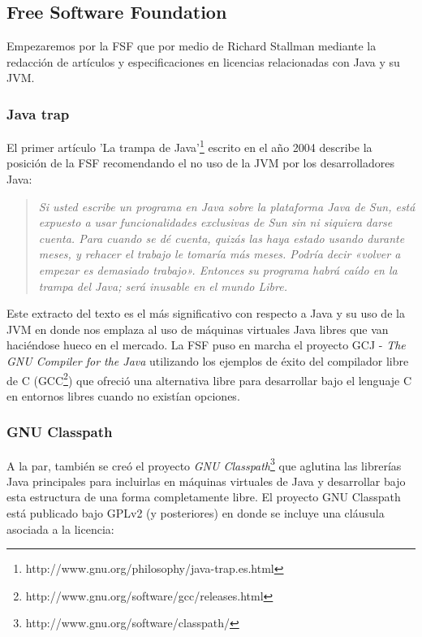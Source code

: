 \documentclass[11pt]{scrartcl}
\begin{document}
\subsection{Free Software Foundation}

Empezaremos por la FSF que por medio de Richard Stallman mediante la redacción de artículos y especificaciones en licencias relacionadas con Java y su JVM.

\subsubsection{Java trap}

El primer artículo 'La trampa de Java'\footnote{http://www.gnu.org/philosophy/java-trap.es.html} escrito en el año 2004 describe la posición de la FSF recomendando el no uso de la JVM por los desarrolladores Java:

\begin{quotation}
    \emph{Si usted escribe un programa en Java sobre la plataforma Java de Sun, está expuesto a usar funcionalidades exclusivas de Sun sin ni siquiera darse cuenta. Para cuando se dé cuenta, quizás las haya estado usando durante meses, y rehacer el trabajo le tomaría más meses. Podría decir «volver a empezar es demasiado trabajo». Entonces su programa habrá caído en la trampa del Java; será inusable en el mundo Libre.}
\end{quotation}

Este extracto del texto es el más significativo con respecto a Java y su uso de la JVM en donde nos emplaza al uso de máquinas virtuales Java libres que van haciéndose hueco en el mercado.
La FSF puso en marcha el proyecto GCJ - \emph{The GNU Compiler for the Java} utilizando los ejemplos de éxito del compilador libre de C (GCC\footnote{http://www.gnu.org/software/gcc/releases.html}) que ofreció una alternativa libre para desarrollar bajo el lenguaje C en entornos libres cuando no existían opciones.

\subsubsection{GNU Classpath}

A la par, también se creó el proyecto \emph{GNU Classpath}\footnote{http://www.gnu.org/software/classpath/} que aglutina las librerías Java principales para incluirlas en máquinas virtuales de Java y desarrollar bajo esta estructura de una forma completamente libre.
El proyecto GNU Classpath está publicado bajo GPLv2 (y posteriores) en donde se incluye una cláusula asociada a la licencia:
\end{document}
